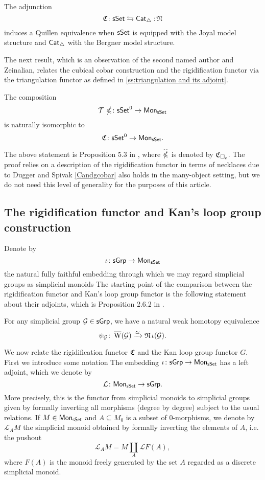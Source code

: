 \begin{proposition} \label{joyalbergner}
	The adjunction
	\[
	\operatorname{\mathfrak{C}} \colon \mathsf{sSet} \leftrightarrows \mathsf{Cat}_{\triangle} :\!\operatorname{\mathfrak{N}}
	\]
	induces a Quillen equivalence when $\mathsf{sSet}$ is equipped with the Joyal model structure and $\mathsf{Cat}_{\triangle}$ with the Bergner model structure.
\end{proposition}

The next result, which is an observation of the second named author and Zeinalian, relates the cubical cobar construction and the rigidification functor via the triangulation functor as defined in \cref{ss:triangulation and its adjoint}.

\begin{proposition} \label{Candgcobar}
	The composition
	\[
	\mathcal{T} \, \operatorname{\mathbb{\Omega}} \colon \mathsf{sSet}^0 \to \mathsf{Mon}_{\mathsf{sSet}}
	\]
	is naturally isomorphic to
	\[
	\operatorname{\mathfrak{C}} \colon \mathsf{sSet}^0 \to \mathsf{Mon}_{\mathsf{sSet}}.
	\]
\end{proposition}

The above statement is Proposition 5.3 in \cite{rivera2018cubical}, where $\operatorname{\widehat{\mathbb{\Omega}}}$ is denoted by $\operatorname{\mathfrak{C}}_{\square_c}$.
The proof relies on a description of the rigidification functor in terms of necklaces due to Dugger and Spivak \cite{dugger2011rigidification}
\cref{Candgcobar} also holds in the many-object setting, but we do not need this level of generality for the purposes of this article.

\subsection{The rigidification functor and Kan's loop group construction}

Denote by
\[
\iota \colon \mathsf{sGrp} \to \mathsf{Mon}_{\mathsf{sSet}}
\]
the natural fully faithful embedding through which we may regard simplicial groups as simplicial monoids
The starting point of the comparison between the rigidification functor and Kan's loop group functor is the following statement about their adjoints, which is Proposition 2.6.2 in \cite{hinich2007deformation}.

\begin{proposition} \label{p:hinich}
	For any simplicial group $\mathcal{G} \in \mathsf{sGrp}$, we have a natural weak homotopy equivalence
	\[
	\psi_{\mathcal{G}} \colon \operatorname{\overline{W}}(\mathcal{G}) \xrightarrow{\simeq} \operatorname{\mathfrak{N}}\iota(\mathcal{G}).
	\]
\end{proposition}

We now relate the rigidification functor $\operatorname{\mathfrak{C}}$ and the Kan loop group functor $G$.
First we introduce some notation
The embedding $\iota \colon \mathsf{sGrp} \to \mathsf{Mon}_{\mathsf{sSet}}$ has a left adjoint, which we denote by
\[
\mathcal{L} \colon \mathsf{Mon}_{\mathsf{sSet}} \to \mathsf{sGrp}.
\]
More precisely, this is the functor from simplicial monoids to simplicial groups given by formally inverting all morphisms (degree by degree) subject to the usual relations.
If $M \in \mathsf{Mon}_{\mathsf{sSet}}$ and $A \subseteq M_0$ is a subset of $0$-morphisms, we denote by $\mathcal{L}_AM$ the simplicial monoid obtained by formally inverting the elements of $A$, i.e. the pushout
\[
\mathcal{L}_AM= M \coprod_A \mathcal{L}F(A),
\]
where $F(A)$ is the monoid freely generated by the set $A$ regarded as a discrete simplicial monoid.

